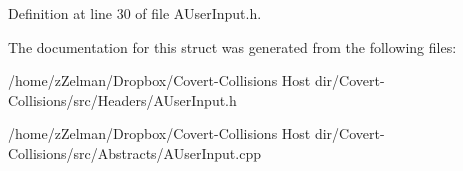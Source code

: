 Definition at line 30 of file A\-User\-Input.\-h.



The documentation for this struct was generated from the following files\-:\begin{DoxyCompactItemize}
\item 
/home/z\-Zelman/\-Dropbox/\-Covert-\/\-Collisions Host dir/\-Covert-\/\-Collisions/src/\-Headers/A\-User\-Input.\-h\item 
/home/z\-Zelman/\-Dropbox/\-Covert-\/\-Collisions Host dir/\-Covert-\/\-Collisions/src/\-Abstracts/A\-User\-Input.\-cpp\end{DoxyCompactItemize}

